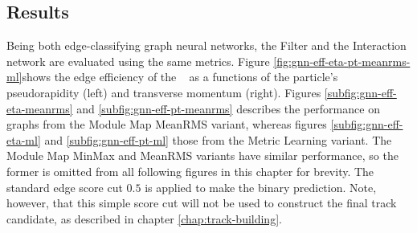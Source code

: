 \subsection{Results}
\label{subsect:ignn-result}


Being both edge-classifying graph neural networks, the Filter and the Interaction network are evaluated using the same metrics. 
Figure \ref{fig:gnn-eff-eta-pt-meanrms-ml}shows the edge efficiency of the \ignn~ as a functions of the particle's pseudorapidity (left) and transverse momentum (right). 
Figures \ref{subfig:gnn-eff-eta-meanrms} and \ref{subfig:gnn-eff-pt-meanrms} describes the performance on graphs from the Module Map MeanRMS variant, whereas figures \ref{subfig:gnn-eff-eta-ml} and \ref{subfig:gnn-eff-pt-ml} those from the Metric Learning variant.
The Module Map MinMax and MeanRMS variants have similar performance, so the former is omitted from all following figures in this chapter for brevity.
The standard edge score cut $0.5$ is applied to make the binary prediction.
Note, however, that this simple score cut will not be used to construct the final track candidate, as described in chapter \ref{chap:track-building}.

